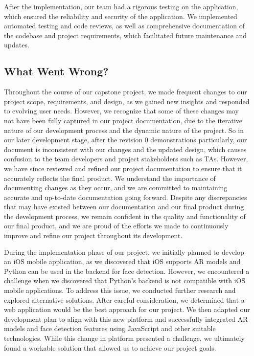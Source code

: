 \documentclass{article}
\begin{document}
After the implementation, our team had a rigorous testing on the application, which ensured the reliability and security of the application. We implemented automated testing and code reviews, as well as comprehensive documentation of the codebase and project requirements, which facilitated future maintenance and updates.

\subsection{What Went Wrong?}

Throughout the course of our capstone project, we made frequent changes to our project scope, requirements, and design, as we gained new insights and responded to evolving user needs. However, we recognize that some of these changes may not have been fully captured in our project documentation, due to the iterative nature of our development process and the dynamic nature of the project. So in our later development stage, after the revision 0 demonstrations particularly, our document is inconsistent with our changes and the updated design, which causes confusion to the team developers and project stakeholders such as TAs. However, we have since reviewed and refined our project documentation to ensure that it accurately reflects the final product. We understand the importance of documenting changes as they occur, and we are committed to maintaining accurate and up-to-date documentation going forward. Despite any discrepancies that may have existed between our documentation and our final product during the development process, we remain confident in the quality and functionality of our final product, and we are proud of the efforts we made to continuously improve and refine our project throughout its development.

During the implementation phase of our project, we initially planned to develop an iOS mobile application, as we discovered that iOS supports AR models and Python can be used in the backend for face detection. However, we encountered a challenge when we discovered that Python's backend is not compatible with iOS mobile applications. To address this issue, we conducted further research and explored alternative solutions. After careful consideration, we determined that a web application would be the best approach for our project. We then adapted our development plan to align with this new platform and successfully integrated AR models and face detection features using JavaScript and other suitable technologies. While this change in platform presented a challenge, we ultimately found a workable solution that allowed us to achieve our project goals.
\end{document}
